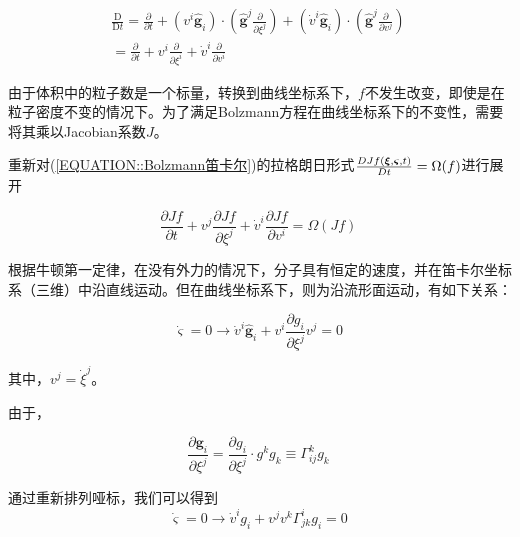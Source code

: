\documentclass[MathematicsNumericsDerivationsAndOpenFOAM.tex]{subfiles}
\begin{document}
\begin{equation}
  \begin{aligned}
    \frac{\mathrm{D}}{\mathrm{D} t}=\frac{\partial}{\partial t}+\left(v^{i} \widehat{\boldsymbol{g}}_{i}\right) \cdot\left(\widehat{\boldsymbol{g}}^{j} \frac{\partial}{\partial \xi^{j}}\right)+\left(\dot{v}^{i} \widehat{\boldsymbol{g}}_{i}\right) \cdot\left(\widehat{\boldsymbol{g}}^{j} \frac{\partial}{\partial v^{j}}\right) \\
    =\frac{\partial}{\partial t}+v^{i} \frac{\partial}{\partial \xi^{i}} + \dot{v}^{i} \frac{\partial}{\partial  v^{i}}
  \end{aligned}
  \label{EQUATION::广义物质导数} ~
\end{equation}


由于体积中的粒子数是一个标量，转换到曲线坐标系下，$f$不发生改变，即使是在粒子密度不变的情况下。为了满足Bolzmann方程在曲线坐标系下的不变性，需要将其乘以Jacobian系数$J$。

重新对(\ref{EQUATION::Bolzmann笛卡尔})的拉格朗日形式${D Jf(\boldsymbol{\xi}, \boldsymbol{\varsigma}, t) \over Dt} =\Omega(f)$进行展开

\begin{equation}
  \frac{\partial Jf}{\partial t}+v^{j} \frac{\partial Jf}{\partial \xi^{j}} + \dot{v}^{i} \frac{\partial Jf}{\partial  v^{i}} =\Omega(Jf)
  \label{EQUATION::Bolzmann中间过程2} ~
\end{equation}

%
%
根据牛顿第一定律，在没有外力的情况下，分子具有恒定的速度，并在笛卡尔坐标系（三维）中沿直线运动。但在曲线坐标系下，则为沿流形面运动，有如下关系：

%
%
\begin{equation}
  \dot{\boldsymbol{\varsigma}}=0 \rightarrow \dot{v}^{i} \widehat{\boldsymbol{g}}_{i}+v^{i} \frac{\partial g_{i}}{\partial \xi^{j}} v^{j}=0
  \label{EQUATION::A.3} ~
\end{equation}
%

其中，$v^{j}=\dot{\xi}^{j}$。
%
%

由于，

\begin{equation}
  \frac{\partial \boldsymbol{g}_{i}}{\partial \xi^{j}}=\frac{\partial g_{i}}{\partial \xi^{j}} \cdot g^{k} g_{k} \equiv \Gamma_{i j}^{k} g_{k}
  \label{EQUATION::A.4} ~
\end{equation}
%
%

通过重新排列哑标，我们可以得到
\begin{equation}
  \dot{\boldsymbol{\varsigma}}=0 \rightarrow \dot{v}^{i} g_{i}+v^{j} v^{k} \Gamma_{j k}^{i} g_{i}=0
  \label{EQUATION::A.5} ~
\end{equation}
%
%
\end{document}
